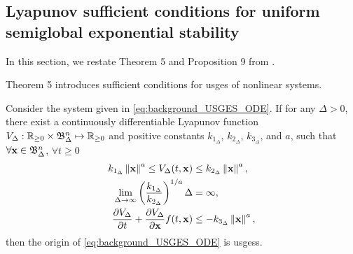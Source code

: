 \subsection{Lyapunov sufficient conditions for uniform semiglobal exponential stability}
In this section, we restate Theorem 5 and Proposition 9 from \cite{pettersen_lyapunov_2017}.

Theorem 5 introduces sufficient conditions for \acrfull{usges} of nonlinear systems.
\begin{theorem}
    \label{thm:background_USGES}
    Consider the system given in \eqref{eq:background_USGES_ODE}.
    If for any $\Delta > 0$, there exist a continuously differentiable Lyapunov function $V_{\Delta} : \mathbb{R}_{\geq 0} \times \mathfrak{B}_{\Delta}^{n} \mapsto \mathbb{R}_{\geq 0}$ and positive constants $k_{1_\Delta}$, $k_{2_\Delta}$, $k_{3_\Delta}$, and $a$, such that $\forall \mathbf{x} \in \mathfrak{B}_{\Delta}^{n}$, $\forall t \geq 0$
    \begin{subequations}
        \begin{align}
            k_{1_\Delta} \left\|\mathbf{x}\right\|^a \leq V_{\Delta}(t, \mathbf{x}) &\leq k_{2_\Delta} \left\|\mathbf{x}\right\|^a, \\
            \lim_{\Delta \rightarrow \infty} \left(\frac{k_{1_\Delta}}{k_{2_\Delta}}\right)^{1/a} \Delta &= \infty, \\
            \frac{\partial V_{\Delta}}{\partial t} + \frac{\partial V_{\Delta}}{\partial \mathbf{x}} f(t, \mathbf{x}) &\leq -k_{3_\Delta} \left\|\mathbf{x}\right\|^a,
        \end{align}
    \end{subequations}
    then the origin of \eqref{eq:background_USGES_ODE} is \glspl{usges}.
\end{theorem}

